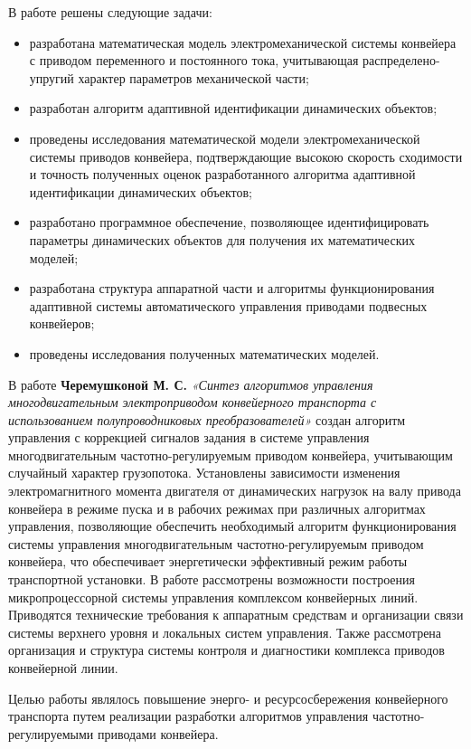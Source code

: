 В работе решены следующие задачи:
\begin{itemize}
\item разработана математическая модель электромеханической системы конвейера с приводом переменного и постоянного тока, учитывающая распределено-упругий характер параметров механической части;
\item разработан алгоритм адаптивной идентификации динамических объектов;
\item проведены исследования математической модели электромеханической системы приводов конвейера, подтверждающие высокою скорость сходимости и точность полученных оценок разработанного алгоритма адаптивной идентификации динамических объектов;
\item разработано программное обеспечение, позволяющее идентифицировать параметры динамических объектов для получения их математических моделей;
\item разработана структура аппаратной части и алгоритмы функционирования адаптивной системы автоматического управления приводами подвесных конвейеров;
\item проведены исследования полученных математических моделей.
\end{itemize}

В работе \textbf{Черемушконой М. С.} \textit{«Синтез алгоритмов управления многодвигательным электроприводом конвейерного транспорта с использованием полупроводниковых преобразователей»} \cite{mcheremushkina} создан алгоритм управления с коррекцией сигналов задания в системе управления многодвигательным частотно-регулируемым приводом конвейера, учитывающим случайный характер грузопотока. Установлены зависимости изменения электромагнитного момента  двигателя от динамических нагрузок на валу привода конвейера в режиме пуска и в рабочих режимах при различных алгоритмах управления, позволяющие обеспечить необходимый алгоритм функционирования системы управления многодвигательным частотно-регулируемым приводом конвейера, что обеспечивает энергетически эффективный режим работы транспортной установки. В работе рассмотрены возможности построения микропроцессорной системы управления комплексом конвейерных линий. Приводятся технические требования к аппаратным средствам и организации связи системы верхнего уровня и локальных систем управления. Также рассмотрена организация и структура системы контроля и диагностики комплекса приводов конвейерной линии. 

Целью работы являлось повышение энерго- и ресурсосбережения конвейерного транспорта путем реализации разработки алгоритмов управления частотно-регулируемыми приводами конвейера. 

